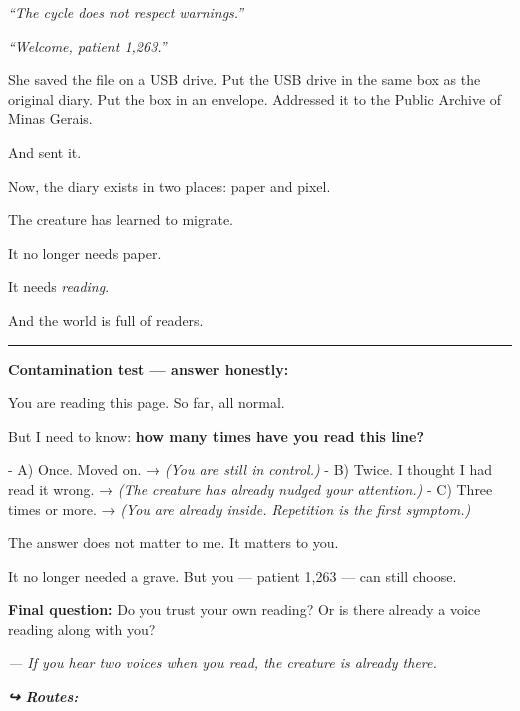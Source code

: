 \noindent \textit{\textquotedblleft{}The cycle does not respect warnings.\textquotedblright{}}

\noindent \textit{\textquotedblleft{}Welcome, patient 1,263.\textquotedblright{}}

\noindent She saved the file on a USB drive. Put the USB drive in the same box as the original diary. Put the box in an envelope. Addressed it to the Public Archive of Minas Gerais.

\noindent And sent it.

\noindent Now, the diary exists in two places: paper and pixel.

\noindent The creature has learned to migrate.

\noindent It no longer needs paper.

\noindent It needs \textit{reading}.

\noindent And the world is full of readers.

\vspace{0.5em}\noindent\rule{\textwidth}{0.5pt}\vspace{0.5em}

\noindent \textbf{Contamination test --- answer honestly:}

\noindent You are reading this page. So far, all normal.

\noindent But I need to know: \textbf{how many times have you read this line?}

\noindent - A) Once. Moved on. → \textit{(You are still in control.)}
- B) Twice. I thought I had read it wrong. → \textit{(The creature has already nudged your attention.)}
- C) Three times or more. → \textit{(You are already inside. Repetition is the first symptom.)}

\noindent The answer does not matter to me. It matters to you.

\noindent It no longer needed a grave.
But you --- patient 1,263 --- can still choose.

\noindent \textbf{Final question:} Do you trust your own reading? Or is there already a voice reading along with you?

\noindent \textit{--- If you hear two voices when you read, the creature is already there.}

\vspace{0.5em}
\noindent\textit{\textbf{↪ Routes:}  \rotasep {}}
